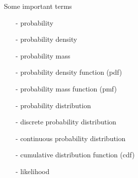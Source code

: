 \documentclass[10pt,handout]{beamer}
\begin{document}
\begin{frame}{Some important terms}

  \begin{itemize}
  \item[-] probability
  \item[-] probability density
  \item[-] probability mass
  \item[-] probability density function (pdf)
  \item[-] probability mass function (pmf)
  \item[-] probability distribution
  \item[-] discrete probability distribution
  \item[-] continuous probability distribution
  \item[-] cumulative distribution function (cdf)
  \item[-] likelihood
  \end{itemize}

\end{frame}
\end{document}

